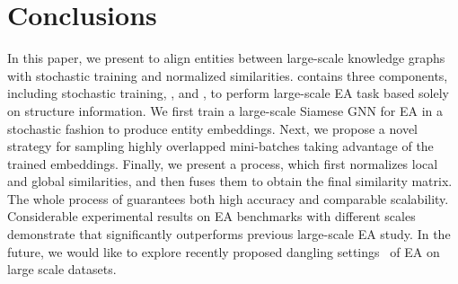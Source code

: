 
\vspace{-2mm}
\section{Conclusions}
\label{sec:conclusions}

In this paper, we present \ClusterEA{} to align entities between large-scale knowledge graphs with stochastic training and normalized similarities.
\ClusterEA{} contains three components, including stochastic training, \Sampling{}, and \Merging{}, to perform large-scale EA task based solely on structure information.
We first train a large-scale Siamese GNN for EA in a stochastic fashion to produce entity embeddings. Next, we propose a novel \Sampling{} strategy for sampling highly overlapped mini-batches taking advantage of the trained embeddings. Finally, we present a \Merging{} process, which first normalizes local and global similarities, and then fuses them to obtain the final similarity matrix. The whole process of \ClusterEA{} guarantees both high accuracy and comparable scalability.
Considerable experimental results on EA benchmarks with different scales demonstrate that \ClusterEA{} significantly outperforms previous large-scale EA study.
In the future, we would like to explore recently proposed dangling settings~\cite{NoMatch21} of EA on large scale datasets. 